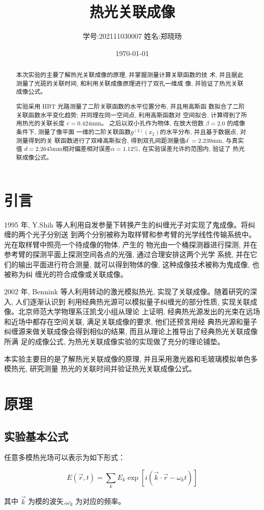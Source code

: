 \documentclass[12pt,a4paper]{article}
\title{\vspace{-4cm}\Large 热光关联成像}  %
\author{\kaishu 学号:202111030007 \hspace{2cm} 姓名:郑晓旸}   %
\date{\today}  %
\newcommand{\be}[1]{
    \begin{equation}
        #1
    \end{equation}
}
\begin{document}
\maketitle

\begin{abstract}
    本次实验的主要了解热光关联成像的原理, 并掌握测量计算关联函数的技
术, 并且据此测量了光斑的关联时间, 和利用关联成像原理进行了双孔一维成
像, 并验证了热光关联成像公式。

实验采用 HBT 光路测量了二阶关联函数的水平位置分布, 并且用高斯函
数拟合了二阶关联函数水平变化趋势; 并同理在同一空间点, 利用高斯函数对
空间拟合, 计算得到了所用热光的关联长度 $c = 0.424 \mathrm{mm}$。
之后以双小孔作为物体, 在放大倍数 $\beta = 2.0$ 的成像条件下, 测量了像平面
一维的二阶关联函数$ g^{(2)}(x_2) $的水平分布, 并且基于数据点, 对测量得到的关
联函数进行了双峰高斯拟合, 得到双孔间距测量值$ d^{\prime} = 2.239\mathrm{mm}$, 与真实值
$d = 2.2645\mathrm{mm} $相对偏差相对误差$ \alpha = 1.12\%$, 
在实验误差允许的范围内, 验证了
热光联成像公式。
\end{abstract}

\section{引言}
1995 年, Y.Shih 等人利用自发参量下转换产生的纠缠光子对实现了鬼成像。将纠缠的两个光子分别送
到两个分别被称为取样臂和参考臂的光学线性传输系统中。光在取样臂中照亮一个待成像的物体, 产生的
物光由一个桶探测器进行探测, 并在参考臂的探测平面上探测空间各点的光强, 通过合理安排这两个光学
系统, 并在它们的输出平面进行符合测量, 就可以得到物体的像, 这种成像技术被称为鬼成像, 也被称为纠
缠光的符合成像或关联成像。

2002 年, Bennink 等人利用转动的激光模拟热光, 实现了关联成像。随着研究的深入, 人们逐渐认识到
利用经典热光源可以模拟量子纠缠光的部分性质, 实现关联成像。北京师范大学物理系汪凯戈小组从理论
上证明, 经典热光源发出的光束在远场和近场中都存在空间关联, 满足关联成像的要求, 他们还预言用经
典热光源和量子纠缠源来做关联成像会得到相似的结果, 而且从理论上推导出了经典热光关联成像所满
足的成像公式, 为热光关联成像实验的实现做了充分的理论铺垫。

本实验主要目的是了解热光关联成像的原理, 并且采用激光器和毛玻璃模拟单色多模热光, 研究测量
热光的关联时间并验证热光关联成像公式。


\section{原理}
\subsection{实验基本公式}
任意多模热光场可以表示为如下形式：
\be{E(\vec{r}, t)=\sum_{k} E_{k} \exp \left[i\left(\vec{k} \cdot \vec{r}-\omega_{k} t\right)\right]}
其中 $\vec k$ 为模的波矢,$\omega_k$ 为对应的频率。
\end{document}
